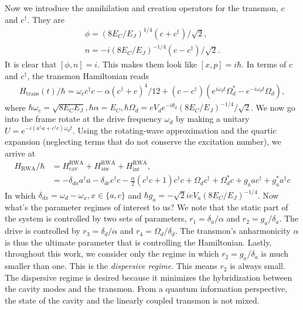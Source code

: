 \documentclass{article}
\begin{document}
Now we introduce the annihilation and creation operators for the transmon, $c$ and $c^\dagger$. They are
\begin{align}
    \phi = (8E_C/E_J)^{1/4}(c+c^\dagger)/\sqrt{2},\\
    n = -i(8E_C/E_J)^{-1/4}(c-c^\dagger)/\sqrt{2}.
\end{align}
It is clear that $[\phi, n]=i$. This makes them look like $[x,p]=i\hbar$. In terms of $c$ and $c^\dagger$, the transmon Hamiltonian reads
\begin{align}
    H_{\text{trans}}(t)/\hbar = \omega_c c^\dagger c - \alpha(c^\dagger+c)^4/12 + (c-c^\dagger)(e^{i\omega_d t}\Omega_d^* - e^{-i\omega_d t}\Omega_d),
\end{align}
where $\hbar\omega_c = \sqrt{8E_CE_J}, \hbar\alpha = E_C, \hbar\Omega_d=eV_de^{-i\theta_d}(8E_C/E_J)^{-1/4}/\sqrt{2}$. We now go into the frame rotate at the drive frequency $\omega_d$ by making a unitary $U=e^{-i(a^\dagger a +c^\dagger c)\omega_d t}$. Using the rotating-wave approximation and the quartic expansion (neglecting terms that do not conserve the excitation number), we arrive at
\begin{align}
    H_{\text{RWA}}/\hbar &= H^{\text{RWA}}_{\text{cav}} + H^{\text{RWA}}_{\text{anc}} + H^{\text{RWA}}_{\text{int}},\\
    &=-\delta_{da}a^\dagger a -\delta_{dc}c^\dagger c - \frac{\alpha}{2}(c^\dagger c+1)c^\dagger c + \Omega_d c^\dagger+\Omega_d^* c+ g_a a c^\dagger + g_a^* a^\dagger c 
\end{align}
In which $\delta_{dx}=\omega_d - \omega_x, x\in\{a, c\}$ and $\hbar g_a=-\sqrt{2}ieV_a(8E_C/E_J)^{-1/4}$.
Now what's the parameter regimes of interest to us? We note that the static part of the system is controlled by two sets of parameters, $r_1=\delta_a/\alpha$ and $r_2 = g_a/\delta_a$. The drive is controlled by $r_3=\delta_d/\alpha$ and $r_4=\Omega_d/\delta_d$. The transmon's anharmonicity $\alpha$ is thus the ultimate parameter that is controlling the Hamiltonian. Lastly, throughout this work, we consider only the regime in which $r_2=g_a/\delta_a$ is much smaller than one. This is the \textit{dispersive regime}. This means $r_2$ is always small. The dispersive regime is desired because it minimizes the hybridization between the cavity modes and the transmon. From a quantum information perspective, the state of the cavity and the linearly coupled transmon is not mixed.
\end{document}
